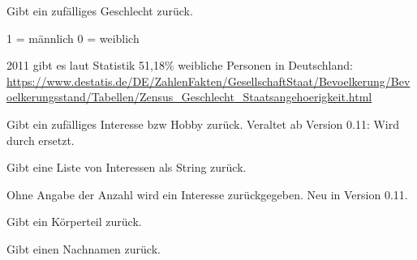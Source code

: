 \documentclass[a4paper,12pt,oneside]{sphinxmanual}
\begin{document}
\begin{fulllineitems}
\label{module:pyzufall.generator.geschlecht}
Gibt ein zufälliges Geschlecht zurück.

1 = männlich
0 = weiblich

2011 gibt es laut Statistik 51,18\% weibliche Personen in Deutschland:
\href{https://www.destatis.de/DE/ZahlenFakten/GesellschaftStaat/Bevoelkerung/Bevoelkerungsstand/Tabellen/Zensus\_Geschlecht\_Staatsangehoerigkeit.html}{https://www.destatis.de/DE/ZahlenFakten/GesellschaftStaat/Bevoelkerung/Bevoelkerungsstand/Tabellen/Zensus\_Geschlecht\_Staatsangehoerigkeit.html}

\end{fulllineitems}


\begin{fulllineitems}
\label{module:pyzufall.generator.interesse}
Gibt ein zufälliges Interesse bzw Hobby zurück.
Veraltet ab Version 0.11: Wird durch {\hyperref[module:pyzufall.generator.interessen_liste]{}} ersetzt.
\end{fulllineitems}


\begin{fulllineitems}
\label{module:pyzufall.generator.interessen_liste}
Gibt eine Liste von Interessen als String zurück.

Ohne Angabe der Anzahl wird ein Interesse zurückgegeben.
Neu in Version 0.11.
\end{fulllineitems}


\begin{fulllineitems}
\label{module:pyzufall.generator.koerperteil}
Gibt ein Körperteil zurück.

\end{fulllineitems}


\begin{fulllineitems}
\label{module:pyzufall.generator.nachname}
Gibt einen Nachnamen zurück.

\end{fulllineitems}
\end{document}
